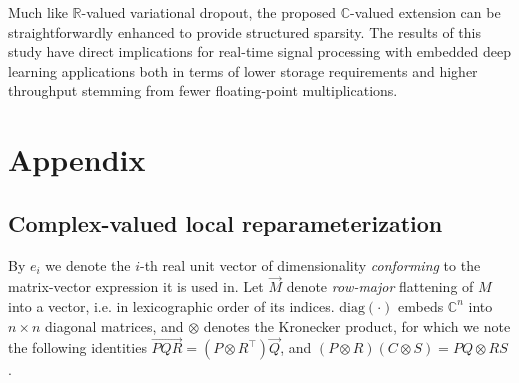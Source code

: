 \documentclass[a4paper,10pt]{article}
\newcommand{\real}{\mathbb{R}}
\newcommand{\cplx}{\mathbb{C}}
\renewcommand{\vec}[1]{\overrightarrow{#1}}
\newcommand{\diag}[1]{\mathrm{diag}{#1}}
\begin{document}
Much like $\real$-valued variational dropout, the proposed $\cplx$-valued extension can be
straightforwardly enhanced to provide structured sparsity. The results of this study have
direct implications for real-time signal processing with embedded deep learning applications
both in terms of lower storage requirements and higher throughput stemming from fewer
floating-point multiplications.


\clearpage




\clearpage

\section{Appendix} %
\label{sec:appendix}

\subsection{Complex-valued local reparameterization} %
\label{sub:complex_valued_local_reparameterization}

By $e_i$ we denote the $i$-th real unit vector of dimensionality \textit{conforming} to the
matrix-vector expression it is used in. Let $\vec{M}$ denote \textit{row-major} flattening
of $M$ into a vector, i.e. in lexicographic order of its indices. $\diag{(\cdot)}$ embeds
$\cplx^n$ into $n\times n$ diagonal matrices, and $\otimes$ denotes the Kronecker product,
for which we note the following identities $
  \vec{P Q R} = (P \otimes R^\top) \vec{Q}
$, and $
  (P \otimes R) (C \otimes S) = P Q \otimes R S
$ \citep{petersen_matrix_2012}.
\end{document}
